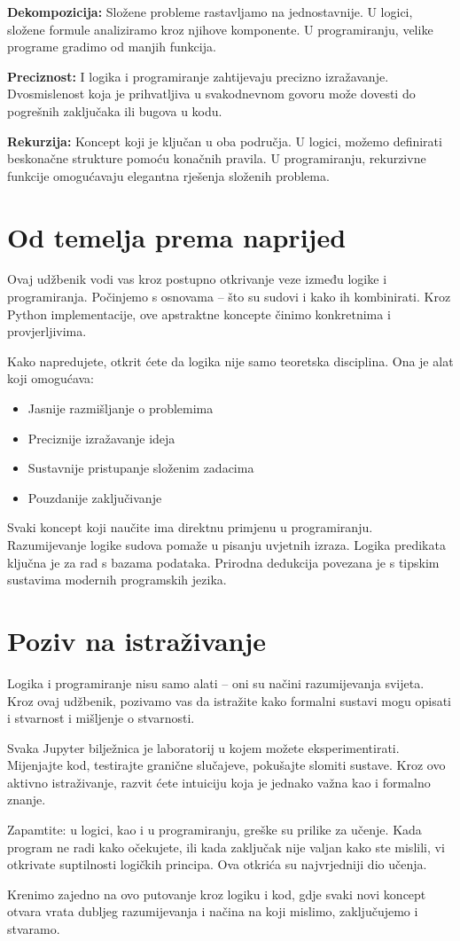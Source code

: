 \textbf{Dekompozicija:} Složene probleme rastavljamo na jednostavnije. U logici, složene formule analiziramo kroz njihove komponente. U programiranju, velike programe gradimo od manjih funkcija.

\textbf{Preciznost:} I logika i programiranje zahtijevaju precizno izražavanje. Dvosmislenost koja je prihvatljiva u svakodnevnom govoru može dovesti do pogrešnih zaključaka ili bugova u kodu.

\textbf{Rekurzija:} Koncept koji je ključan u oba područja. U logici, možemo definirati beskonačne strukture pomoću konačnih pravila. U programiranju, rekurzivne funkcije omogućavaju elegantna rješenja složenih problema.

\section*{Od temelja prema naprijed}

Ovaj udžbenik vodi vas kroz postupno otkrivanje veze između logike i programiranja. Počinjemo s osnovama -- što su sudovi i kako ih kombinirati. Kroz Python implementacije, ove apstraktne koncepte činimo konkretnima i provjerljivima.

Kako napredujete, otkrit ćete da logika nije samo teoretska disciplina. Ona je alat koji omogućava:
\begin{itemize}
\item Jasnije razmišljanje o problemima
\item Preciznije izražavanje ideja
\item Sustavnije pristupanje složenim zadacima
\item Pouzdanije zaključivanje
\end{itemize}

Svaki koncept koji naučite ima direktnu primjenu u programiranju. Razumijevanje logike sudova pomaže u pisanju uvjetnih izraza. Logika predikata ključna je za rad s bazama podataka. Prirodna dedukcija povezana je s tipskim sustavima modernih programskih jezika.

\section*{Poziv na istraživanje}

Logika i programiranje nisu samo alati -- oni su načini razumijevanja svijeta. Kroz ovaj udžbenik, pozivamo vas da istražite kako formalni sustavi mogu opisati i stvarnost i mišljenje o stvarnosti.

Svaka Jupyter bilježnica je laboratorij u kojem možete eksperimentirati. Mijenjajte kod, testirajte granične slučajeve, pokušajte slomiti sustave. Kroz ovo aktivno istraživanje, razvit ćete intuiciju koja je jednako važna kao i formalno znanje.

Zapamtite: u logici, kao i u programiranju, greške su prilike za učenje. Kada program ne radi kako očekujete, ili kada zaključak nije valjan kako ste mislili, vi otkrivate suptilnosti logičkih principa. Ova otkrića su najvrjedniji dio učenja.

Krenimo zajedno na ovo putovanje kroz logiku i kod, gdje svaki novi koncept otvara vrata dubljeg razumijevanja i načina na koji mislimo, zaključujemo i stvaramo.

